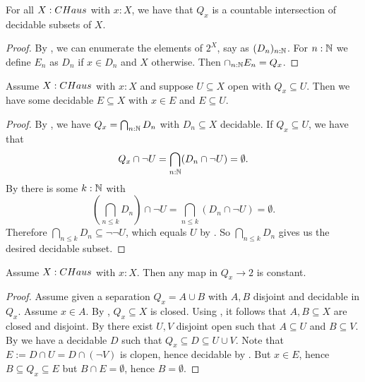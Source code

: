 \begin{lemma}\label{ConnectedComponentClosedInCompactHausdorff}
For all $X:\CHaus$ with $x:X$, we have that $Q_x$ is a countable intersection of decidable subsets of $X$.
\end{lemma}
\begin{proof}
  By ,
  we can enumerate the elements of $2^X$, say as $(D_n)_{n:\mathbb{N}}$. 
  For $n:\mathbb{N}$ we define $E_n$ as $D_n$ if $x\in D_n$ and $X$ otherwise. 
  Then $\cap_{n:\mathbb{N}}E_n = Q_x$.
\end{proof}

\begin{lemma}\label{ConnectedComponentSubOpenHasDecidableInbetween}
  Assume $X:\Chaus$ with $x:X$ and suppose $U\subseteq X$ open with $Q_x\subseteq U$. 
  Then we have some decidable $E\subseteq X$ with $x\in E$ and $E\subseteq U$. 
\end{lemma}
\begin{proof}
  By , 
  we have $Q_x = \bigcap_{n:\mathbb{N}}D_n$ with $D_n\subseteq X$ decidable. 
  If $Q_x \subseteq U$, we have that 
  $$Q_x\cap \neg U = \bigcap_{n:\mathbb{N}} (D_n \cap \neg U) = \emptyset.$$
  By  there is some $k:\mathbb{N}$ with 
  $$(\bigcap_{n\leq k} D_n )\cap \neg U  = \bigcap_{n\leq k} (D_n \cap \neg U) = \emptyset.$$
  Therefore $\bigcap_{n\leq k} D_n \subseteq \neg\neg U$, which equals $U$ by . So $\bigcap_{n\leq k} D_n$ gives us the desired decidable subset.
\end{proof}

\begin{lemma}\label{ConnectedComponentConnected}
Assume $X:\Chaus$ with $x:X$. Then any map in $Q_x\to 2$ is constant.
\end{lemma}
\begin{proof}
Assume given a separation $Q_x = A\cup B$ with $A,B$ disjoint and decidable in $Q_x$. Assume $x\in A$. 
By , $Q_x\subseteq X$ is closed. 
Using , it follows that $A,B\subseteq X$ are closed and disjoint.
By  there exist $U,V$ disjoint open such that $A\subseteq U$ and $B\subseteq V$. 
By  we have a decidable $D$ such that $Q_x\subseteq D\subseteq U\cup V$. 
Note that $E := D\cap U = D \cap (\neg V)$ is clopen, hence decidable by .
But $x\in E$, hence $B\subseteq Q_x \subseteq E$ but $B \cap E = \emptyset$, hence $B=\emptyset$. 
\end{proof}

